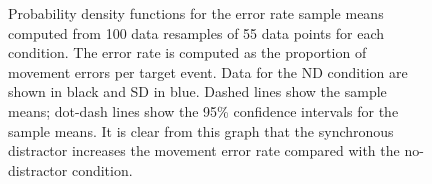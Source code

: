 \documentclass[10pt,letterpaper]{article}
\begin{document}
\begin{figure}[htb!]
\centering
\caption[Bootstrapped error PDFS] {Probability density functions for
  the error rate sample means computed from 100 data resamples of 55
  data points for each condition. The error rate is computed as the
  proportion of movement errors per target event. Data for the ND
  condition are shown in black and SD in blue. Dashed lines show the
  sample means; dot-dash lines show the 95\% confidence intervals for
  the sample means. It is clear from this graph that
  the synchronous distractor increases the movement error rate
  compared with the no-distractor condition.}
\label{bootstrap_errors}
\end{figure}



\end{document}
